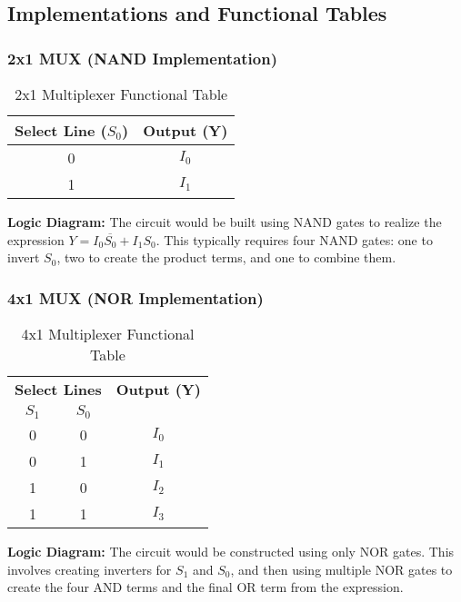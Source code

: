 \documentclass[11pt]{article}
\begin{document}
\subsection{Implementations and Functional Tables}
\subsubsection{2x1 MUX (NAND Implementation)}
\begin{table}[htbp]
    \centering
    \caption{2x1 Multiplexer Functional Table}
    \begin{tabular}{c c}
        \toprule
        \textbf{Select Line ($S_0$)} & \textbf{Output (Y)} \\ \midrule
        0 & $I_0$ \\
        1 & $I_1$ \\ \bottomrule
    \end{tabular}
\end{table}
\textbf{Logic Diagram:} The circuit would be built using NAND gates to realize the expression $Y = I_0 \overline{S_0} + I_1 S_0$. This typically requires four NAND gates: one to invert $S_0$, two to create the product terms, and one to combine them.

\subsubsection{4x1 MUX (NOR Implementation)}
\begin{table}[htbp]
    \centering
    \caption{4x1 Multiplexer Functional Table}
    \begin{tabular}{cc c}
        \toprule
        \multicolumn{2}{c}{\textbf{Select Lines}} & \textbf{Output (Y)} \\
        \cmidrule(r){1-2}
        \textbf{$S_1$} & \textbf{$S_0$} & \\ \midrule
        0 & 0 & $I_0$ \\
        0 & 1 & $I_1$ \\
        1 & 0 & $I_2$ \\
        1 & 1 & $I_3$ \\ \bottomrule
    \end{tabular}
\end{table}
\textbf{Logic Diagram:} The circuit would be constructed using only NOR gates. This involves creating inverters for $S_1$ and $S_0$, and then using multiple NOR gates to create the four AND terms and the final OR term from the expression.
\end{document}
